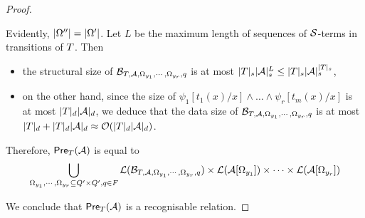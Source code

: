 \begin{proof}
\begin{itemize}
\end{itemize}
%
%
Evidently, $|\Omega''| = |\Omega'|$.  Let $L$ be the maximum length of sequences of $\mathcal{S}$-terms in transitions of $T$. Then 
\begin{itemize}
\item the structural size of $\mathcal{B}_{T, \mathcal{A}, \Omega_{y_1}, \cdots, \Omega_{y_r}, q}$ is at most $|T|_s |\mathcal{A}|_s^{L} \le |T|_s |\mathcal{A}|_s^{|T|_s}$,
%
\item  on the other hand, since the size of $\psi_1[t_1(x)/x] \wedge \ldots \wedge \psi_r[t_m(x)/x]$ is at most $|T|_d |\mathcal{A}|_d$, we deduce that the data size of $\mathcal{B}_{T, \mathcal{A}, \Omega_{y_1}, \cdots, \Omega_{y_r}, q}$ is at most $|T|_d + |T|_d |\mathcal{A}|_d \approx \mathcal{O}(|T|_d |\mathcal{A}|_d)$.
\end{itemize}


Therefore, $\textsf{Pre}_{T}(\mathcal{A})$ is equal to 
\[
\bigcup_{\Omega_{y_1}, \cdots, \Omega_{y_r} \subseteq Q' \times Q', q\in F} \mathcal{L}(\mathcal{B}_{T, \mathcal{A}, \Omega_{y_1}, \cdots, \Omega_{y_r},q}) \times \mathcal{L}(\mathcal{A}[\Omega_{y_1}]) \times \cdots  \times \mathcal{L}(\mathcal{A}[\Omega_{y_r}])\]

We conclude that $\textsf{Pre}_{T}(\mathcal{A})$ is a recognisable relation. 


\end{proof}
